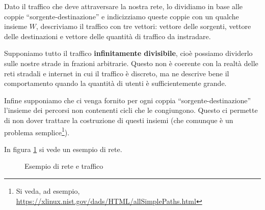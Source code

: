 \documentclass[a4paper]{article}
\theoremstyle{plain}
\theoremstyle{definition}
\theoremstyle{remark}
\begin{document}
Dato il traffico che deve attraversare la nostra rete, lo dividiamo in
base alle coppie ``sorgente-destinazione'' e indicizziamo queste
coppie con un qualche insieme $W$, descriviamo il traffico con tre
vettori: vettore delle sorgenti, vettore delle destinazioni e vettore
delle quantità di traffico da instradare.

Supponiamo tutto il traffico \textbf{infinitamente divisibile}, cioè
possiamo dividerlo sulle nostre strade in frazioni arbitrarie. Questo
non è coerente con la realtà delle reti stradali e internet in cui il
traffico è discreto, ma ne descrive bene il comportamento quando la
quantità di utenti è sufficientemente grande.

Infine supponiamo che ci venga fornito per ogni coppia
``sorgente-destinazione'' l'insieme dei percorsi non contenenti cicli
che le congiungono. Questo ci permette di non dover trattare la
costruzione di questi insiemi (che comunque è un problema
semplice\footnote{Si veda, ad esempio,
  \url{https://xlinux.nist.gov/dads/HTML/allSimplePaths.html}}).

In figura \ref{fig:esempio-rete} si vede un esempio di rete.

\begin{figure}[ht]
  \centering
  \caption{Esempio di rete e traffico}
  \label{fig:esempio-rete}
\end{figure}
\end{document}
